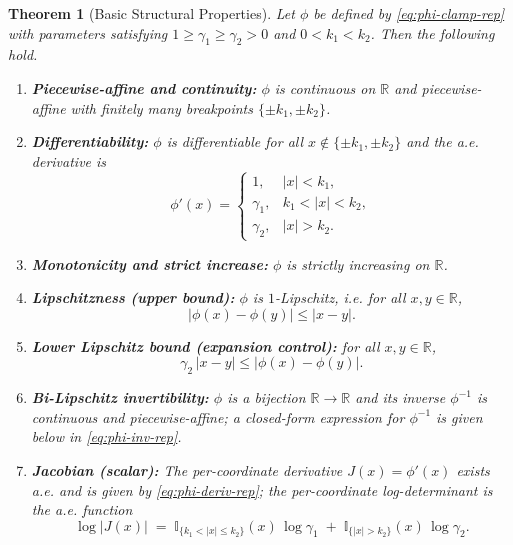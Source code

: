 \documentclass[11pt, twoside, openright, english]{article}
\newcommand{\I}{\mathbb{I}}
\newcommand{\R}{\mathbb{R}}
\numberwithin{equation}{section}
\theoremstyle{plain}
\newtheorem{theorem}{Theorem}[section]
\theoremstyle{definition}
\theoremstyle{remark}
\begin{document}
\begin{theorem}[Basic Structural Properties]\label{thm:basic-properties}
Let $\phi$ be defined by \eqref{eq:phi-clamp-rep} with parameters satisfying $1\ge \gamma_1\ge\gamma_2>0$ and $0<k_1<k_2$. Then the following hold.
\begin{enumerate}[label=(\roman*)]
  \item \textbf{Piecewise-affine and continuity:} $\phi$ is continuous on $\R$ and piecewise-affine with finitely many breakpoints $\{\pm k_1,\pm k_2\}$.
  \item \textbf{Differentiability:} $\phi$ is differentiable for all $x\notin\{\pm k_1,\pm k_2\}$ and the a.e. derivative is
  \begin{equation}\label{eq:phi-deriv-rep}
    \phi'(x)=\begin{cases}
      1, & |x|<k_1,\\[3pt]
      \gamma_1, & k_1<|x|<k_2,\\[3pt]
      \gamma_2, & |x|>k_2.
    \end{cases}
  \end{equation}
  \item \textbf{Monotonicity and strict increase:} $\phi$ is strictly increasing on $\R$.
  \item \textbf{Lipschitzness (upper bound):} $\phi$ is $1$-Lipschitz, i.e. for all $x,y\in\R$,
  \[
    |\phi(x)-\phi(y)|\le |x-y|.
  \]
  \item \textbf{Lower Lipschitz bound (expansion control):} for all $x,y\in\R$,
  \[
    \gamma_2\,|x-y| \le |\phi(x)-\phi(y)|.
  \]
  \item \textbf{Bi-Lipschitz invertibility:} $\phi$ is a bijection $\R\to\R$ and its inverse $\phi^{-1}$ is continuous and piecewise-affine; a closed-form expression for $\phi^{-1}$ is given below in \eqref{eq:phi-inv-rep}.
  \item \textbf{Jacobian (scalar):} The per-coordinate derivative $J(x)=\phi'(x)$ exists a.e. and is given by \eqref{eq:phi-deriv-rep}; the per-coordinate log-determinant is the a.e. function
  \[
    \log|J(x)| \;=\; \I_{\{k_1<|x|\le k_2\}}(x)\,\log\gamma_1 \;+\; \I_{\{|x|>k_2\}}(x)\,\log\gamma_2.
  \]
\end{enumerate}
\end{theorem}
\end{document}
